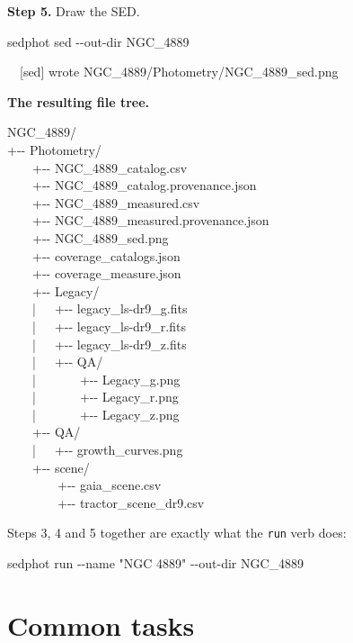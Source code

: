 \documentclass[11pt]{article}
\newcommand{\cmdline}[1]{\begin{cmd}\ttfamily #1\end{cmd}}
\begin{document}
\textbf{Step 5.} Draw the SED.

\cmdline{sedphot sed -{}-out-dir NGC\_4889}

\cmdline{\frenchspacing \mbox{}~~[sed] wrote NGC\_4889/Photometry/NGC\_4889\_sed.png}

\textbf{The resulting file tree.}

\begin{cmd}\ttfamily\frenchspacing
NGC\_4889/\\
+-{}- Photometry/\\
\mbox{}~~~~+-{}- NGC\_4889\_catalog.csv\\
\mbox{}~~~~+-{}- NGC\_4889\_catalog.provenance.json\\
\mbox{}~~~~+-{}- NGC\_4889\_measured.csv\\
\mbox{}~~~~+-{}- NGC\_4889\_measured.provenance.json\\
\mbox{}~~~~+-{}- NGC\_4889\_sed.png\\
\mbox{}~~~~+-{}- coverage\_catalogs.json\\
\mbox{}~~~~+-{}- coverage\_measure.json\\
\mbox{}~~~~+-{}- Legacy/\\
\mbox{}~~~~|~~~+-{}- legacy\_ls-dr9\_g.fits\\
\mbox{}~~~~|~~~+-{}- legacy\_ls-dr9\_r.fits\\
\mbox{}~~~~|~~~+-{}- legacy\_ls-dr9\_z.fits\\
\mbox{}~~~~|~~~+-{}- QA/\\
\mbox{}~~~~|~~~~~~~+-{}- Legacy\_g.png\\
\mbox{}~~~~|~~~~~~~+-{}- Legacy\_r.png\\
\mbox{}~~~~|~~~~~~~+-{}- Legacy\_z.png\\
\mbox{}~~~~+-{}- QA/\\
\mbox{}~~~~|~~~+-{}- growth\_curves.png\\
\mbox{}~~~~+-{}- scene/\\
\mbox{}~~~~~~~~+-{}- gaia\_scene.csv\\
\mbox{}~~~~~~~~+-{}- tractor\_scene\_dr9.csv
\end{cmd}

Steps 3, 4 and 5 together are exactly what the \texttt{run} verb does:

\cmdline{sedphot run -{}-name "NGC 4889" -{}-out-dir NGC\_4889}

\section{Common tasks}
\end{document}
